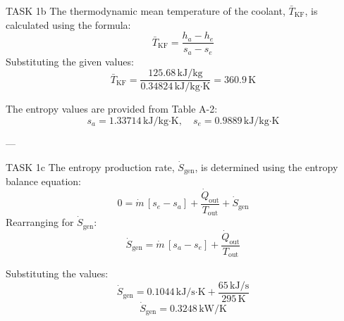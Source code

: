 TASK 1b  
The thermodynamic mean temperature of the coolant, \( \bar{T}_{\text{KF}} \), is calculated using the formula:  
\[
\bar{T}_{\text{KF}} = \frac{h_a - h_e}{s_a - s_e}
\]  
Substituting the given values:  
\[
\bar{T}_{\text{KF}} = \frac{125.68 \, \text{kJ/kg}}{0.34824 \, \text{kJ/kg·K}} = 360.9 \, \text{K}
\]  

The entropy values are provided from Table A-2:  
\[
s_a = 1.33714 \, \text{kJ/kg·K}, \quad s_e = 0.9889 \, \text{kJ/kg·K}
\]  

---

TASK 1c  
The entropy production rate, \( \dot{S}_{\text{gen}} \), is determined using the entropy balance equation:  
\[
0 = \dot{m} \, [s_e - s_a] + \frac{\dot{Q}_{\text{out}}}{T_{\text{out}}} + \dot{S}_{\text{gen}}
\]  
Rearranging for \( \dot{S}_{\text{gen}} \):  
\[
\dot{S}_{\text{gen}} = \dot{m} \, [s_a - s_e] + \frac{\dot{Q}_{\text{out}}}{T_{\text{out}}}
\]  

Substituting the values:  
\[
\dot{S}_{\text{gen}} = 0.1044 \, \text{kJ/s·K} + \frac{65 \, \text{kJ/s}}{295 \, \text{K}}
\]  
\[
\dot{S}_{\text{gen}} = 0.3248 \, \text{kW/K}
\]